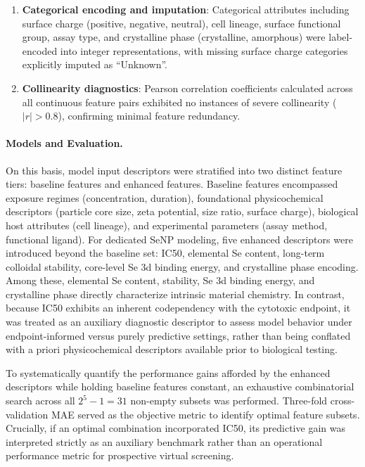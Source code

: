 \begin{enumerate}
  \item \textbf{Categorical encoding and imputation}: Categorical attributes including surface charge (positive, negative, neutral), cell lineage, surface functional group, assay type, and crystalline phase (crystalline, amorphous) were label-encoded into integer representations, with missing surface charge categories explicitly imputed as ``Unknown''.

  \item \textbf{Collinearity diagnostics}: Pearson correlation coefficients calculated across all continuous feature pairs exhibited no instances of severe collinearity ($|r| > 0.8$), confirming minimal feature redundancy.
\end{enumerate}

\paragraph{Models and Evaluation.}

On this basis, model input descriptors were stratified into two distinct feature tiers: baseline features and enhanced features. Baseline features encompassed exposure regimes (concentration, duration), foundational physicochemical descriptors (particle core size, zeta potential, size ratio, surface charge), biological host attributes (cell lineage), and experimental parameters (assay method, functional ligand).
For dedicated SeNP modeling, five enhanced descriptors were introduced beyond the baseline set: IC50, elemental Se content, long-term colloidal stability, core-level Se 3d binding energy, and crystalline phase encoding. Among these, elemental Se content, stability, Se 3d binding energy, and crystalline phase directly characterize intrinsic material chemistry. In contrast, because IC50 exhibits an inherent codependency with the cytotoxic endpoint, it was treated as an auxiliary diagnostic descriptor to assess model behavior under endpoint-informed versus purely predictive settings, rather than being conflated with a priori physicochemical descriptors available prior to biological testing.

To systematically quantify the performance gains afforded by the enhanced descriptors while holding baseline features constant, an exhaustive combinatorial search across all $2^5 - 1 = 31$ non-empty subsets was performed. Three-fold cross-validation MAE served as the objective metric to identify optimal feature subsets. Crucially, if an optimal combination incorporated IC50, its predictive gain was interpreted strictly as an auxiliary benchmark rather than an operational performance metric for prospective virtual screening.

